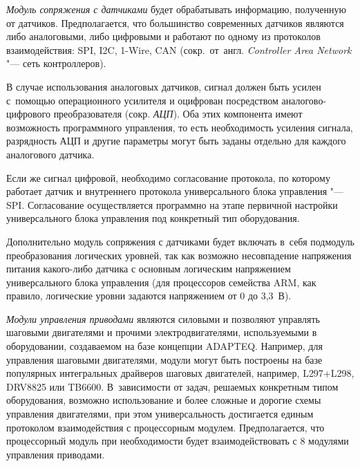 \textit{Модуль сопряжения с датчиками} будет обрабатывать информацию, полученную от датчиков. Предполагается, что большинство современных датчиков являются либо аналоговыми, либо цифровыми и работают по одному из протоколов взаимодействия: \foreignlanguage{english}{SPI}, \foreignlanguage{english}{I}2\foreignlanguage{english}{C}, 1-\foreignlanguage{english}{Wire}, \foreignlanguage{english}{CAN} (сокр.~от~англ. \textit{Controller Area Network} "--- сеть контроллеров).

В случае использования аналоговых датчиков, сигнал должен быть усилен с~помощью операционного усилителя и оцифрован посредством аналогово-цифрового преобразователя (сокр. \textit{АЦП}). Оба этих компонента имеют возможность программного управления, то есть необходимость усиления сигнала, разрядность АЦП и другие параметры могут быть заданы отдельно для каждого аналогового датчика.

Если же сигнал цифровой, необходимо согласование протокола, по которому работает датчик и внутреннего протокола универсального блока управления "--- \foreignlanguage{english}{SPI}. Согласование осуществляется программно на этапе первичной настройки универсального блока управления под конкретный тип оборудования.

Дополнительно модуль сопряжения с датчиками будет включать в~себя подмодуль преобразования логических уровней, так как возможно несовпадение напряжения питания какого-либо датчика с основным логическим напряжением универсального блока управления (для процессоров семейства \foreignlanguage{english}{ARM}, как правило, логические уровни задаются напряжением от 0 до 3,3~В).

\textit{Модули управления приводами} являются силовыми и позволяют управлять шаговыми двигателями и прочими электродвигателями, используемыми в оборудовании, создаваемом на базе концепции \foreignlanguage{english}{ADAPTEQ}. Например, для управления шаговыми двигателями, модули могут быть построены на базе популярных интегральных драйверов шаговых двигателей, например, \foreignlanguage{english}{L}297+\foreignlanguage{english}{L}298, \foreignlanguage{english}{DRV}8825 или \foreignlanguage{english}{TB}6600. В~зависимости от задач, решаемых конкретным типом оборудования, возможно использование и более сложные и дорогие схемы управления двигателями, при этом универсальность достигается единым протоколом взаимодействия с процессорным модулем. Предполагается, что процессорный модуль при необходимости будет взаимодействовать с 8 модулями управления приводами.

